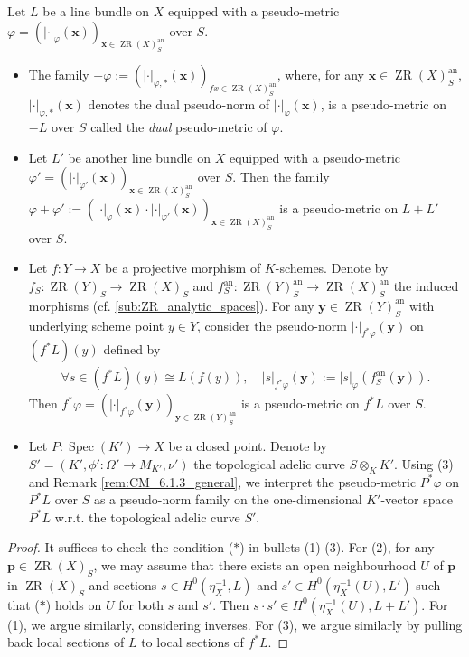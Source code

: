 \documentclass [11pt,reqno]{amsart}
\newcommand{\1}{\mathmybb{1}}
\def\an{\operatorname{an}}
\def\Spec{\operatorname{Spec}}
\def\ZR{\operatorname{ZR}}
\begin{document}
\begin{proposition-definition}
\label{def:pseudo-metric_family_algebraic_constructions}
Let $L$ be a line bundle on $X$ equipped with a pseudo-metric $\varphi=(|\cdot|_{\varphi}(\mathbf{x}))_{\mathbf{x}\in \ZR(X)^{\an}_{S}}$ over $S$.
\begin{itemize}
	\item[(1)] The family $-\varphi:=(|\cdot|_{\varphi,\ast}(\mathbf{x}))_{f{x}\in \ZR(X)^{\an}_{S}}$, where, for any $\mathbf{x}\in \ZR(X)^{\an}_{S}$, $|\cdot|_{\varphi,\ast}(\mathbf{x})$ denotes the dual pseudo-norm of $|\cdot|_{\varphi}(\mathbf{x})$, is a pseudo-metric on $-L$ over $S$ called the \emph{dual} pseudo-metric of $\varphi$.
	\item[(2)] Let $L'$ be another line bundle on $X$ equipped with a pseudo-metric $\varphi'=(|\cdot|_{\varphi'}(\mathbf{x}))_{\mathbf{x}\in \ZR(X)^{\an}_{S}}$ over $S$. Then the family $\varphi+\varphi':=(|\cdot|_{\varphi}(\mathbf{x})\cdot|\cdot|_{\varphi'}(\mathbf{x}))_{\mathbf{x}\in \ZR(X)^{\an}_{S}}$ is a pseudo-metric on $L+L'$ over $S$.
	\item[(3)] Let $f : Y \to X$ be a projective morphism of $K$-schemes. Denote by $f_{S}:\ZR(Y)_{S}\to\ZR(X)_{S}$ and $f_{S}^{\an}:\ZR(Y)^{\an}_{S}\to\ZR(X)^{\an}_{S}$ the induced morphisms (cf. \ref{sub:ZR_analytic_spaces}). For any $\mathbf{y}\in \ZR(Y)^{\an}_{S}$ with underlying scheme point $y\in Y$, consider the pseudo-norm $|\cdot|_{f^{\ast}\varphi}(\mathbf{y})$ on $(f^{\ast}L)(y)$ defined by
	\begin{align*}
	\forall s\in (f^{\ast}L)(y)\cong L(f(y)), \quad |s|_{f^{\ast}\varphi}(\mathbf{y}) := |s|_{\varphi}(f^{\an}_{S}(\mathbf{y})).
	\end{align*}
Then $f^{\ast}\varphi=(|\cdot|_{f^{\ast}\varphi}(\mathbf{y}))_{\mathbf{y}\in\ZR(Y)^{\an}_{S}}$ is a pseudo-metric on $f^{\ast}L$ over $S$.
	\item[(4)] Let $P : \Spec(K') \to X$ be a closed point. Denote by $S'=(K',\phi': \Omega' \to M_{K'},\nu')$ the topological adelic curve $S \otimes_{K} K'$. Using (3) and Remark \ref{rem:CM_6.1.3_general}, we interpret the pseudo-metric $P^{\ast}\varphi$ on $P^{\ast}L$ over $S$ as a pseudo-norm family on the one-dimensional $K'$-vector space $P^{\ast}L$ w.r.t. the topological adelic curve $S'$.
\end{itemize}
\end{proposition-definition}

\begin{proof}
It suffices to check the condition ($\ast$) in bullets (1)-(3).  For (2), for any $\mathbf{p}\in\ZR(X)_{S}$, we may assume that there exists an open neighbourhood $U$ of $\mathbf{p}$ in $\ZR(X)_{S}$ and sections $s\in H^{0}(\eta_{X}^{-1},L)$ and $s'\in H^{0}(\eta_{X}^{-1}(U),L')$ such that ($\ast$) holds on $U$ for both $s$ and $s'$. Then $s\cdot s'\in H^{0}(\eta_{X}^{-1}(U),L+L')$. For (1), we argue similarly, considering inverses. For (3), we argue similarly by pulling back local sections of $L$ to local sections of $f^{\ast}L$.  
\end{proof}
\end{document}
